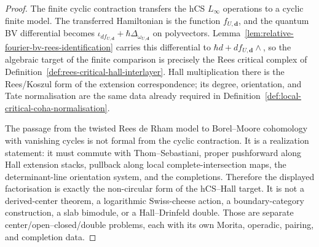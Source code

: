 \begin{proof}
The finite cyclic contraction transfers the hCS $L_\infty$ operations
to a cyclic finite model. The transferred Hamiltonian is the function
$f_{U,\mathbf d}$, and the quantum BV differential becomes
$\iota_{df_{U,\mathbf d}}+\hbar\Delta_{\omega_{U,\mathbf d}}$ on
polyvectors. Lemma~\ref{lem:relative-fourier-bv-rees-identification}
carries this differential to
$\hbar d+df_{U,\mathbf d}\wedge$, so the algebraic target of the finite
comparison is precisely the Rees critical complex of
Definition~\ref{def:rees-critical-hall-interlayer}. Hall multiplication
there is the Rees/Koszul form of the extension correspondence; its
degree, orientation, and Tate normalisation are the same data already
required in Definition~\ref{def:local-critical-coha-normalisation}.

The passage from the twisted Rees de Rham model to
Borel--Moore cohomology with vanishing cycles is not formal from the
cyclic contraction. It is a realization statement: it must commute with
Thom--Sebastiani, proper pushforward along Hall extension stacks,
pullback along local complete-intersection maps, the determinant-line
orientation system, and the completions. Therefore the displayed
factorisation is exactly the non-circular form of the hCS--Hall target.
It is not a derived-center theorem, a logarithmic Swiss-cheese action, a
boundary-category construction, a slab bimodule, or a Hall--Drinfeld
double. Those are separate center/open--closed/double problems, each with
its own Morita, operadic, pairing, and completion data.
\end{proof}

